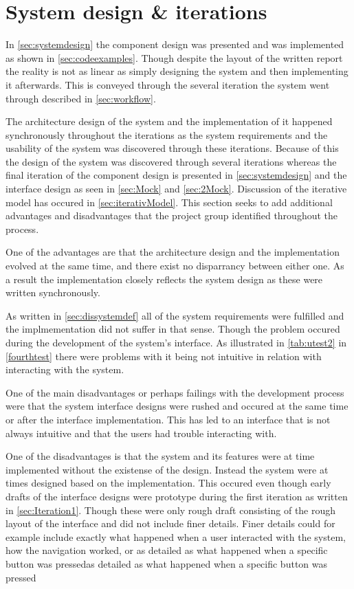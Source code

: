 \section{System design \& iterations}

In \cref{sec:systemdesign} the component design was presented and was implemented as shown in \cref{sec:codeexamples}.
Though despite the layout of the written report the reality is not as linear as simply designing the system and then implementing it afterwards.
This is conveyed through the several iteration the system went through described in \cref{sec:workflow}.

The architecture design of the system and the implementation of it happened synchronously throughout the iterations as the system requirements and the usability of the system was discovered through these iterations.
Because of this the design of the system was discovered through several iterations whereas the final iteration of the component design is presented in \cref{sec:systemdesign} and the interface design as seen in \cref{sec:Mock} and \ref{sec:2Mock}.
Discussion of the iterative model has occured in \cref{sec:iterativModel}.
This section seeks to add additional advantages and disadvantages that the project group identified throughout the process.

One of the advantages are that the architecture design and the implementation evolved at the same time, and there exist no disparrancy between either one.
As a result the implementation closely reflects the system design as these were written synchronously.

As written in \cref{sec:dissystemdef} all of the system requirements were fulfilled and the implmementation did not suffer in that sense.
Though the problem occured during the development of the system's interface.
As illustrated in \cref{tab:utest2} in \cref{fourthtest} there were problems with it being not intuitive in relation with interacting with the system. 

One of the main disadvantages or perhaps failings with the development process were that the system interface designs were rushed and occured at the same time or after the interface implementation.
This has led to an interface that is not always intuitive and that the users had trouble interacting with.

One of the disadvantages is that the system and its features were at time implemented without the existense of the design.
Instead the system were at times designed based on the implementation.
This occured even though early drafts of the interface designs were prototype during the first iteration as written in \cref{sec:Iteration1}.
Though these were only rough draft consisting of the rough layout of the interface and did not include finer details.
Finer details could for example include exactly what happened when a user interacted with the system, how the navigation worked, or as detailed as what happened when a specific button was pressedas detailed as what happened when a specific button was pressed

